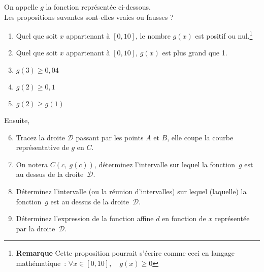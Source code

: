 \exercice On appelle $g$ la fonction représentée ci-dessous.\\ Les propositions suvantes sont-elles vraies ou fausses ?

\begin{enumerate}
	\item Quel que soit $x$ appartenant à $[0,10]$, le nombre $g(x)$ est positif ou nul.\footnote{\textbf{Remarque} Cette proposition pourrait s'écrire comme ceci en langage mathématique~: $\forall x \in [0,10],\quad g(x) \geqslant 0$}
	\item Quel que soit $x$ appartenant à $[0,10]$, $g(x)$ est plus grand que 1.
	\item $g(3) \geqslant 0,04$
	\item $g(2) \geqslant 0,1$
	\item $g(2) \geqslant g(1)$
\end{enumerate}
\begin{center}
	
\end{center}
Ensuite,
\begin{enumerate}
	\setcounter{enumi}{5}
	\item Tracez la droite $\mathcal{D}$ passant par les points $A$ et $B$, elle coupe la courbe représentative de $g$ en $C$.
	\item On notera $C\left(c,~g\left(c\right)\right)$, déterminez l'intervalle sur lequel la fonction~$g$ est au dessus de la droite~$\mathcal{D}$.
	\item Déterminez l'intervalle (ou la réunion d'intervalles) sur lequel (laquelle) la fonction~$g$ est au dessus de la droite~$\mathcal{D}$.
	\item Déterminez l'expression de la fonction affine $d$ en fonction de $x$ représentée par la droite~$\mathcal{D}$.
\end{enumerate}